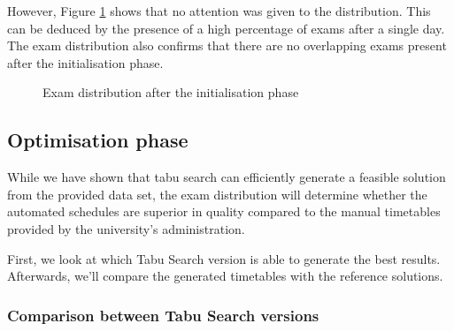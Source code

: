However, Figure \ref{fig:init} shows that no attention was given to the distribution. This can be deduced by the presence of a high percentage of exams after a single day. The exam distribution also confirms that there are no overlapping exams present after the initialisation phase.

\begin{figure}[H]
  \centering
  \hfill
  \caption{Exam distribution after the initialisation phase}
  \label{fig:init}
\end{figure}

\subsection{Optimisation phase}

While we have shown that tabu search can efficiently generate a feasible solution from the provided data set, the exam distribution will determine whether the automated schedules are superior in quality compared to the manual timetables provided by the university's administration.

First, we look at which Tabu Search version is able to generate the best results. Afterwards, we'll compare the generated timetables with the reference solutions.

\subsubsection{Comparison between Tabu Search versions}

